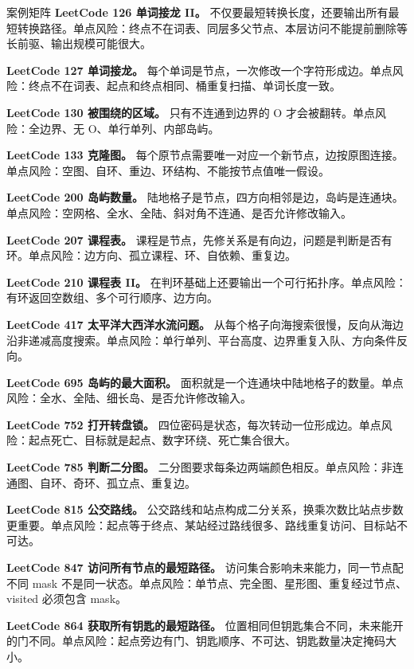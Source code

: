 \begin{principlebox}{案例矩阵}
\textbf{LeetCode 126 单词接龙 II。}
不仅要最短转换长度，还要输出所有最短转换路径。单点风险：终点不在词表、同层多父节点、本层访问不能提前删除等长前驱、输出规模可能很大。

\textbf{LeetCode 127 单词接龙。}
每个单词是节点，一次修改一个字符形成边。单点风险：终点不在词表、起点和终点相同、桶重复扫描、单词长度一致。

\textbf{LeetCode 130 被围绕的区域。}
只有不连通到边界的 O 才会被翻转。单点风险：全边界、无 O、单行单列、内部岛屿。

\textbf{LeetCode 133 克隆图。}
每个原节点需要唯一对应一个新节点，边按原图连接。单点风险：空图、自环、重边、环结构、不能按节点值唯一假设。

\textbf{LeetCode 200 岛屿数量。}
陆地格子是节点，四方向相邻是边，岛屿是连通块。单点风险：空网格、全水、全陆、斜对角不连通、是否允许修改输入。

\textbf{LeetCode 207 课程表。}
课程是节点，先修关系是有向边，问题是判断是否有环。单点风险：边方向、孤立课程、环、自依赖、重复边。

\textbf{LeetCode 210 课程表 II。}
在判环基础上还要输出一个可行拓扑序。单点风险：有环返回空数组、多个可行顺序、边方向。

\textbf{LeetCode 417 太平洋大西洋水流问题。}
从每个格子向海搜索很慢，反向从海边沿非递减高度搜索。单点风险：单行单列、平台高度、边界重复入队、方向条件反向。

\textbf{LeetCode 695 岛屿的最大面积。}
面积就是一个连通块中陆地格子的数量。单点风险：全水、全陆、细长岛、是否允许修改输入。

\textbf{LeetCode 752 打开转盘锁。}
四位密码是状态，每次转动一位形成边。单点风险：起点死亡、目标就是起点、数字环绕、死亡集合很大。

\textbf{LeetCode 785 判断二分图。}
二分图要求每条边两端颜色相反。单点风险：非连通图、自环、奇环、孤立点、重复边。

\textbf{LeetCode 815 公交路线。}
公交路线和站点构成二分关系，换乘次数比站点步数更重要。单点风险：起点等于终点、某站经过路线很多、路线重复访问、目标站不可达。

\textbf{LeetCode 847 访问所有节点的最短路径。}
访问集合影响未来能力，同一节点配不同 mask 不是同一状态。单点风险：单节点、完全图、星形图、重复经过节点、visited 必须包含 mask。

\textbf{LeetCode 864 获取所有钥匙的最短路径。}
位置相同但钥匙集合不同，未来能开的门不同。单点风险：起点旁边有门、钥匙顺序、不可达、钥匙数量决定掩码大小。


\end{principlebox}
